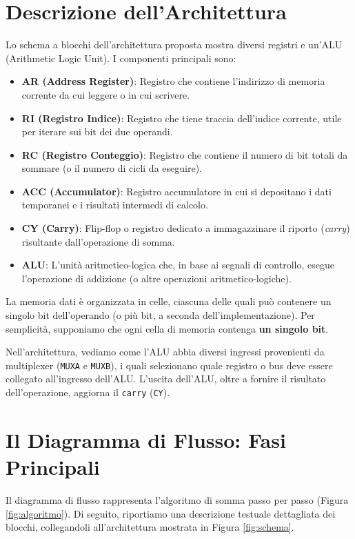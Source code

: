 \documentclass[a4paper,12pt]{report}
\begin{document}
\section{Descrizione dell'Architettura}
Lo schema a blocchi dell'architettura proposta mostra diversi registri e un'ALU (Arithmetic Logic Unit). I componenti principali sono:
\begin{itemize}
    \item \textbf{AR (Address Register)}: Registro che contiene l'indirizzo di memoria corrente da cui leggere o in cui scrivere.
    \item \textbf{RI (Registro Indice)}: Registro che tiene traccia dell'indice corrente, utile per iterare sui bit dei due operandi.
    \item \textbf{RC (Registro Conteggio)}: Registro che contiene il numero di bit totali da sommare (o il numero di cicli da eseguire).
    \item \textbf{ACC (Accumulator)}: Registro accumulatore in cui si depositano i dati temporanei e i risultati intermedi di calcolo.
    \item \textbf{CY (Carry)}: Flip-flop o registro dedicato a immagazzinare il riporto (\textit{carry}) risultante dall'operazione di somma.
    \item \textbf{ALU}: L'unità aritmetico-logica che, in base ai segnali di controllo, esegue l'operazione di addizione (o altre operazioni aritmetico-logiche).
\end{itemize}

La memoria dati è organizzata in celle, ciascuna delle quali può contenere un singolo bit dell'operando (o più bit, a seconda dell'implementazione). Per semplicità, supponiamo che ogni cella di memoria contenga \textbf{un singolo bit}.

Nell'architettura, vediamo come l'ALU abbia diversi ingressi provenienti da multiplexer (\texttt{MUXA} e \texttt{MUXB}), i quali selezionano quale registro o bus deve essere collegato all'ingresso dell'ALU. L'uscita dell'ALU, oltre a fornire il risultato dell'operazione, aggiorna il \texttt{carry} (\texttt{CY}).

\section{Il Diagramma di Flusso: Fasi Principali}
Il diagramma di flusso rappresenta l'algoritmo di somma passo per passo (Figura \ref{fig:algoritmo}). Di seguito, riportiamo una descrizione testuale dettagliata dei blocchi, collegandoli all'architettura mostrata in Figura \ref{fig:schema}.
\end{document}
